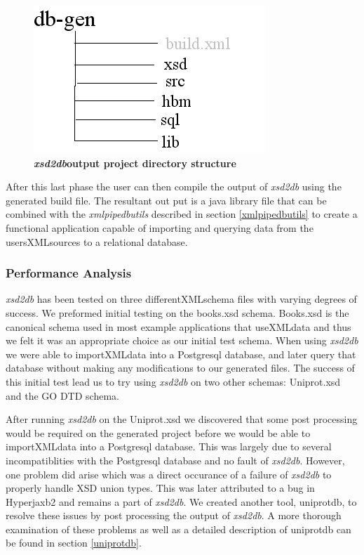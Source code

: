\begin{figure}[htbp]
\begin{center}
\includegraphics[scale=0.8]{./Images/xsd2dbStructure.jpg}
\caption{{\bf \emph{xsd2db}output project directory structure}}
\label{xsd2dbStructure}
\end{center}
\end{figure}

After this last phase the user can then compile the output of \emph{xsd2db} using the generated build file.  The resultant out put is a java library file that can be combined with the \emph{xmlpipedbutils} described in section \ref{xmlpipedbutils} to create a functional application capable of importing and querying data from the usersXMLsources to a relational database.

\subsubsection{Performance Analysis}
\emph{xsd2db} has been tested on three differentXMLschema files with varying degrees of success.  We preformed initial testing on the books.xsd schema.  Books.xsd is the canonical schema used in most example applications that useXMLdata and thus we felt it was an appropriate choice as our initial test schema.  When using \emph{xsd2db} we were able to importXMLdata into a Postgresql database, and later query that database without making any modifications to our generated files.  The success of this initial test lead us to try using \emph{xsd2db} on two other schemas: Uniprot.xsd and the GO DTD schema.  

After running \emph{xsd2db} on the Uniprot.xsd we discovered that some post processing would be required on the generated project before we would be able to importXMLdata into a Postgresql database.  This was largely due to several incompatiblities with the Postgresql database and no fault of \emph{xsd2db}.  However, one problem did arise which was a direct occurance of a failure of \emph{xsd2db} to properly handle XSD union types.  This was later attributed to a bug in Hyperjaxb2  and remains a part of \emph{xsd2db}.  We created another tool, uniprotdb, to resolve these issues by post processing the output of \emph{xsd2db}.  A more thorough examination of these problems as well as a detailed description of uniprotdb can be found in section \ref{uniprotdb}.

